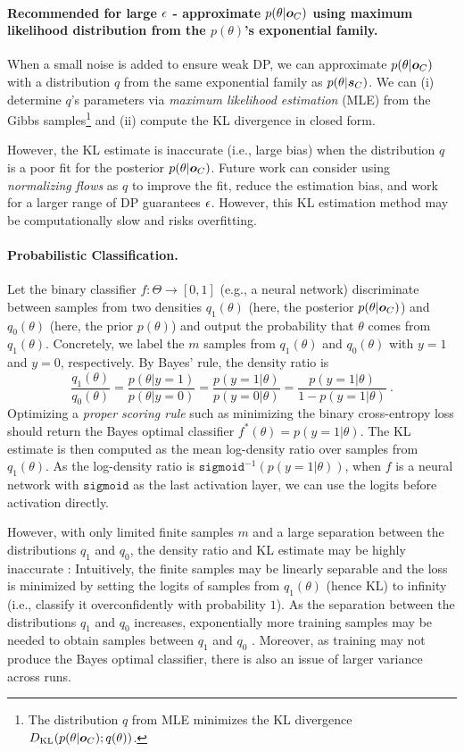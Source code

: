 \documentclass{article}
\theoremstyle{plain}
\theoremstyle{definition}
\theoremstyle{remark}
\begin{document}
\paragraph{Recommended for large ${\epsilon}$ - approximate $p(\theta|{\bm{o}}_C)$ using maximum likelihood distribution from the $p(\theta)$'s exponential family.} 
When a small noise is added to ensure weak DP, we can approximate $p(\theta|{\bm{o}}_C)$ with a distribution $q$ from the same exponential family as $p(\theta|{\bm{s}}_C)$. We can (i) determine $q$'s parameters via \emph{maximum likelihood estimation} (MLE) from the Gibbs samples\footnote{The distribution $q$ from MLE minimizes the KL divergence $D_{\mathrm{KL}}\hspace{-0.5mm}\left(p(\theta|{\bm{o}}_C);q(\theta)\right)$.} and (ii) compute the KL divergence in closed form.

However, the KL estimate is inaccurate (i.e., large bias) when the distribution $q$ is a poor fit for the posterior $p(\theta|{\bm{o}}_C)$. Future work can consider using \emph{normalizing flows} as $q$ to improve the fit, reduce the estimation bias, and work for a larger range of DP guarantees ${\epsilon}$. However, this KL estimation method may be computationally slow and risks overfitting.

\paragraph{Probabilistic Classification.} Let the binary classifier $f: \Theta \rightarrow [0,1]$ (e.g., a neural network) discriminate between samples from two densities $q_1(\theta)$ (here, the posterior $p(\theta|{\bm{o}}_C)$) and $q_0(\theta)$ (here, the prior $p(\theta)$) and output the probability that $\theta$ comes from $q_1(\theta)$.
Concretely, we label the $m$ samples from $q_1(\theta)$ and $q_0(\theta)$ with $y=1$ and $y=0$, respectively. By Bayes' rule, the density ratio is
\[
\frac{q_1(\theta)}{q_0(\theta)} = \frac{p(\theta|y=1)}{p(\theta|y=0)} = \frac{p(y=1|\theta)}{p(y=0|\theta)} = 
\frac{p(y=1|\theta)}{1-p(y=1|\theta)}
\ . 
\]
Optimizing a \emph{proper scoring rule} such as minimizing the binary cross-entropy loss should return the Bayes optimal classifier $f^*(\theta) = p(y=1|\theta)$. The KL estimate is then computed as the mean log-density ratio over samples from $q_1(\theta)$. As the log-density ratio is $\texttt{sigmoid}^{-1}(p(y=1|\theta))$, when $f$ is a neural network with $\texttt{sigmoid}$ as the last activation layer, we can use the logits before activation directly.

However, with only limited finite samples $m$ and a large separation between the distributions $q_1$ and $q_0$, the density ratio and KL estimate may be highly inaccurate \cite{choi2021featurized}:
Intuitively, the finite samples may be linearly separable and the loss is minimized by setting the logits of samples from $q_1(\theta)$ (hence KL) to infinity (i.e.,  classify it overconfidently with probability $1$). 
As the separation between the distributions $q_1$ and $q_0$ increases, exponentially more training samples may be needed to obtain samples between $q_1$ and $q_0$ \cite{choi2021featurized}.
Moreover, as training may not produce the Bayes optimal classifier, there is also an  issue of larger variance across runs.
\end{document}
